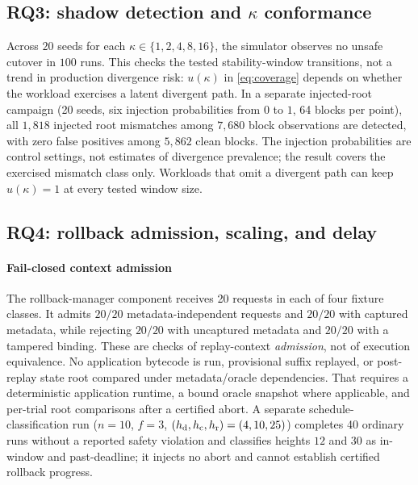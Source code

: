 \subsection{RQ3: shadow detection and \texorpdfstring{$\kappa$}{kappa} conformance}
Across $20$ seeds for each $\kappa\in\{1,2,4,8,16\}$, the simulator observes no unsafe
cutover in $100$ runs. This checks the tested stability-window transitions, not a trend in
production divergence risk: $u(\kappa)$ in \eqref{eq:coverage} depends on whether the workload
exercises a latent divergent path. In a separate injected-root campaign (20 seeds, six
injection probabilities from $0$ to $1$, 64 blocks per point), all $1{,}818$ injected
root mismatches among $7{,}680$ block observations are detected, with zero false positives
among $5{,}862$ clean blocks. The injection probabilities are control settings, not estimates
of divergence prevalence; the result covers the exercised mismatch class only. Workloads
that omit a divergent path can keep $u(\kappa)=1$ at every tested window size.

\subsection{RQ4: rollback admission, scaling, and delay}
\paragraph{Fail-closed context admission}
The rollback-manager component receives 20 requests in each of four fixture classes.
It admits $20/20$ metadata-independent requests and $20/20$ with captured metadata,
while rejecting $20/20$ with uncaptured metadata and $20/20$ with a tampered binding.
These are checks of replay-context \emph{admission}, not of execution equivalence. No
application bytecode is run, provisional suffix replayed, or post-replay state root
compared under metadata/oracle dependencies. That requires a deterministic application
runtime, a bound oracle snapshot where applicable, and per-trial root comparisons after
a certified abort. A separate schedule-classification run ($n=10$, $f=3$,
$(h_{\mathrm d},h_{\mathrm c},h_{\mathrm r})=(4,10,25)$) completes 40 ordinary runs without a reported safety
violation and classifies heights $12$ and $30$ as in-window and past-deadline;
it injects no abort and cannot establish certified rollback progress.

